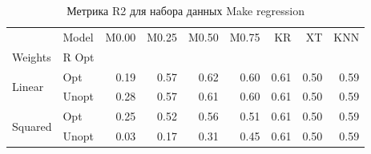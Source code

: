 \begin{table}
\caption{Метрика R2 для набора данных Make regression}
\label{tab:R2_Make regression}
\begin{tabular}{llrrrrrrr}
\toprule
 & Model & M0.00 & M0.25 & M0.50 & M0.75 & KR & XT & KNN \\
Weights & R Opt &  &  &  &  &  &  &  \\
\midrule
\multirow[t]{2}{*}{Linear} & Opt & 0.19 & 0.57 & 0.62 & 0.60 & 0.61 & 0.50 & 0.59 \\
 & Unopt & 0.28 & 0.57 & 0.61 & 0.60 & 0.61 & 0.50 & 0.59 \\

\multirow[t]{2}{*}{Squared} & Opt & 0.25 & 0.52 & 0.56 & 0.51 & 0.61 & 0.50 & 0.59 \\
 & Unopt & 0.03 & 0.17 & 0.31 & 0.45 & 0.61 & 0.50 & 0.59 \\

\bottomrule
\end{tabular}
\end{table}
